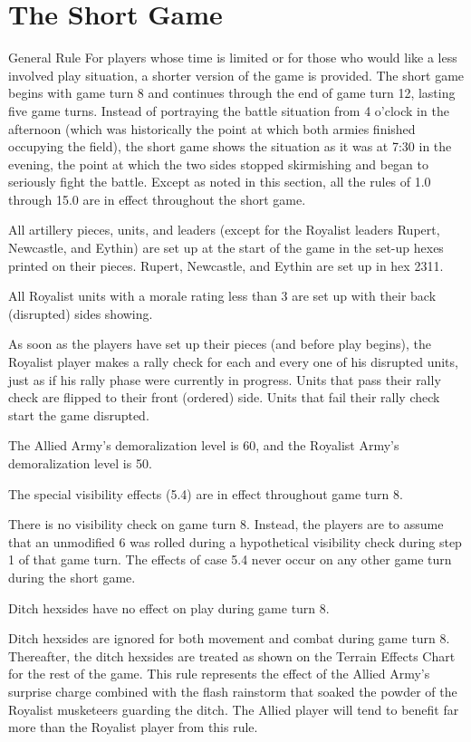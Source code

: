 \section{The Short Game}

\begin{rulebox}{General Rule}
For players whose time is limited or for those who would like a less involved play situation, a shorter version of the game is provided. The short game begins with game turn 8 and continues through the end of game turn 12, lasting five game turns. Instead of portraying the battle situation from 4 o'clock in the afternoon (which was historically the point at which both armies finished occupying the field), the short game shows the situation as it was at 7:30 in the evening, the point at which the two sides stopped skirmishing and began to seriously fight the battle. Except as noted in this section, all the rules of 1.0 through 15.0 are in effect throughout the short game.
\end{rulebox}

 All artillery pieces, units, and leaders (except for the Royalist leaders Rupert, Newcastle, and Eythin) are set up at the start of the game in the set-up hexes printed on their pieces. Rupert, Newcastle, and Eythin are set up in hex 2311.

 All Royalist units with a morale rating less than 3 are set up with their back (disrupted) sides showing.

As soon as the players have set up their pieces (and before play begins), the Royalist player makes a rally check for each and every one of his disrupted units, just as if his rally phase were currently in progress. Units that pass their rally check are flipped to their front (ordered) side. Units that fail their rally check start the game disrupted.

 The Allied Army's demoralization level is 60, and the Royalist Army's demoralization level is 50.

 The special visibility effects (5.4) are in effect throughout game turn 8.

There is no visibility check on game turn 8. Instead, the players are to assume that an unmodified 6 was rolled during a hypothetical visibility check during step 1 of that game turn. The effects of case 5.4 never occur on any other game turn during the short game.

 Ditch hexsides have no effect on play during game turn 8.

Ditch hexsides are ignored for both movement and combat during game turn 8. Thereafter, the ditch hexsides are treated as shown on the Terrain Effects Chart for the rest of the game. This rule represents the effect of the Allied Army's surprise charge combined with the flash rainstorm that soaked the powder of the Royalist musketeers guarding the ditch. The Allied player will tend to benefit far more than the Royalist player from this rule.
